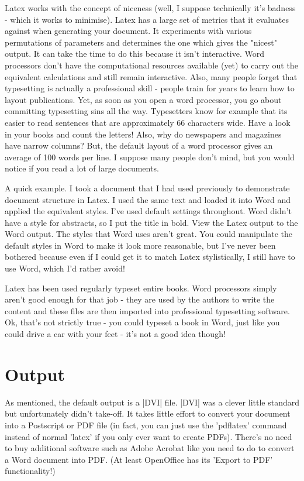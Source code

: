 Latex works with the concept of niceness (well, I suppose technically it's badness - which it works to minimise). Latex has a large set of metrics that it evaluates against when generating your document. It experiments with various permutations of parameters and determines the one which gives the "nicest" output. It can take the time to do this because it isn't interactive. Word processors don't have the computational resources available (yet) to carry out the equivalent calculations and still remain interactive. Also, many people forget that typesetting is actually a professional skill - people train for years to learn how to layout publications. Yet, as soon as you open a word processor, you go about committing typesetting sins all the way. Typesetters know for example that its easier to read sentences that are approximately 66 characters wide. Have a look in your books and count the letters! Also, why do newspapers and magazines have narrow columns? But, the default layout of a word processor gives an average of 100 words per line. I suppose many people don't mind, but you would notice if you read a lot of large documents.

A quick example. I took a document that I had used previously to demonstrate document structure in Latex. I used the same text and loaded it into Word and applied the equivalent styles. I've used default settings throughout. Word didn't have a style for abstracts, so I put the title in bold. View the Latex output to the Word output. The styles that Word uses aren't great. You could manipulate the default styles in Word to make it look more reasonable, but I've never been bothered because even if I could get it to match Latex stylistically, I still have to use Word, which I'd rather avoid!

Latex has been used regularly typeset entire books. Word processors simply aren't good enough for that job - they are used by the authors to write the content and these files are then imported into professional typesetting software. Ok, that's not strictly true - you could typeset a book in Word, just like you could drive a car with your feet - it's not a good idea though!

\section{Output}
As mentioned, the default output is a |DVI| file. |DVI| was a clever little standard but unfortunately didn't take-off. It takes little effort to convert your document into a Postscript or PDF file (in fact, you can just use the 'pdflatex' command instead of normal 'latex' if you only ever want to create PDFs). There's no need to buy additional software such as Adobe Acrobat like you need to do to convert a Word document into PDF. (At least OpenOffice has its 'Export to PDF' functionality!)

